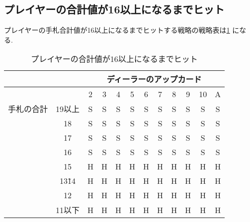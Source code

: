 \subsection{プレイヤーの合計値が16以上になるまでヒット}
プレイヤーの手札合計値が16以上になるまでヒットする戦略の戦略表は\ref{hitleq16}
になる.
\begin{table}[htbp]
  \centering
  \caption{プレイヤーの合計値が16以上になるまでヒット\label{hitleq16}}
  \begin{tabular}{|c|c|c|c|c|c|c|c|c|c|c|c|}
    \hline
    \multicolumn{2}{|c|}{} & \multicolumn{10}{|c|}{ディーラーのアップカード} \\ \hline
    \multicolumn{2}{|c|}{} & 2 & 3 & 4 & 5 & 6 & 7 & 8 & 9 & 10 & A \\ \hline
    手札の合計 & 19以上 & S & S & S & S & S & S & S & S & S & S \\ \cline{3-12}
              & 18 & S & S & S & S & S & S & S & S & S & S \\ \cline{3-12}
              & 17 & S & S & S & S & S & S & S & S & S & S \\ \cline{3-12}
              & 16 & S & S & S & S & S & S & S & S & S & S \\ \cline{3-12}
              & 15 & H & H & H & H & H & H & H & H & H & H \\ \cline{3-12}
              & 13\~ 14 & H & H & H & H & H & H & H & H & H & H \\ \cline{3-12}
              & 12 & H & H & H & H & H & H & H & H & H & H \\ \cline{3-12}
              & 11以下 & H & H & H & H & H & H & H & H & H & H \\ \hline
  \end{tabular}
\end{table}

